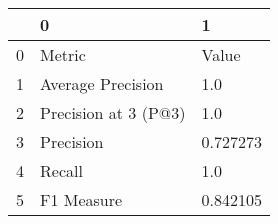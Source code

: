 \begin{tabular}{lll}
\toprule
{} &                     0 &         1 \\
\midrule
0 &                Metric &     Value \\
1 &     Average Precision &       1.0 \\
2 &  Precision at 3 (P@3) &       1.0 \\
3 &             Precision &  0.727273 \\
4 &                Recall &       1.0 \\
5 &            F1 Measure &  0.842105 \\
\bottomrule
\end{tabular}
